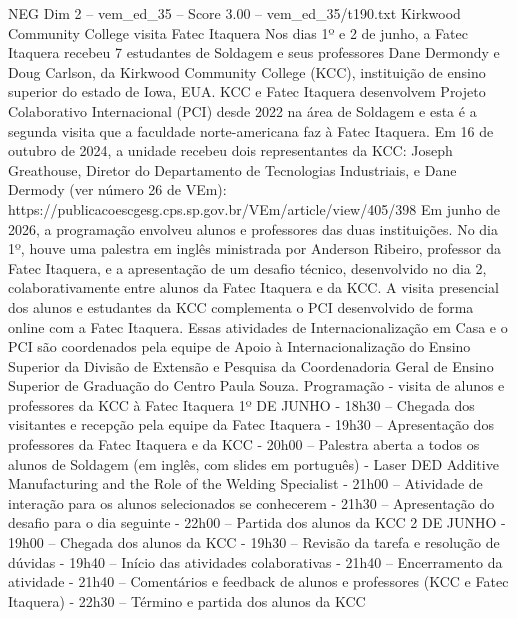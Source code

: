 \begin{textsample}{NEG Dim 2 – vem\_ed\_35 – Score 3.00 – vem\_ed\_35/t190.txt}  \label{ex:f2_neg_136}
Kirkwood Community College visita Fatec Itaquera Nos dias 1º e 2 de junho, a Fatec Itaquera recebeu 7 estudantes de Soldagem e seus professores Dane Dermondy e Doug Carlson, da Kirkwood Community College (KCC), instituição de ensino superior do estado de Iowa, EUA.
KCC e Fatec Itaquera desenvolvem Projeto Colaborativo Internacional (PCI) desde 2022 na área de Soldagem e esta é a segunda visita que a faculdade norte-americana faz à Fatec Itaquera.
Em 16 de outubro de 2024, a unidade recebeu dois representantes da KCC: Joseph Greathouse, Diretor do Departamento de Tecnologias Industriais, e Dane Dermody (ver número 26 de VEm): https://publicacoescgesg.cps.sp.gov.br/VEm/article/view/405/398 Em junho de 2026, a programação envolveu alunos e professores das duas instituições.
No dia 1º, houve uma palestra em inglês ministrada por Anderson Ribeiro, professor da Fatec Itaquera, e a apresentação de um desafio técnico, desenvolvido no dia 2, colaborativamente entre alunos da Fatec Itaquera e da KCC.
A visita presencial dos alunos e estudantes da KCC complementa o PCI desenvolvido de forma online com a Fatec Itaquera.
Essas atividades de Internacionalização em Casa e o PCI são coordenados pela equipe de Apoio à Internacionalização do Ensino Superior da Divisão de Extensão e Pesquisa da Coordenadoria Geral de Ensino Superior de Graduação do Centro Paula Souza.
Programação - visita de alunos e professores da KCC à Fatec Itaquera 1º DE JUNHO - 18h30 – Chegada dos visitantes e recepção pela equipe da Fatec Itaquera - 19h30 – Apresentação dos professores da Fatec Itaquera e da KCC - 20h00 – Palestra aberta a todos os alunos de Soldagem (em inglês, com slides em português) - Laser DED Additive Manufacturing and the Role of the Welding Specialist - 21h00 – Atividade de interação para os alunos selecionados se conhecerem - 21h30 – Apresentação do desafio para o dia seguinte - 22h00 – Partida dos alunos da KCC 2 DE JUNHO - 19h00 – Chegada dos alunos da KCC - 19h30 – Revisão da tarefa e resolução de dúvidas - 19h40 – Início das atividades colaborativas - 21h40 – Encerramento da atividade - 21h40 – Comentários e feedback de alunos e professores (KCC e Fatec Itaquera) - 22h30 – Término e partida dos alunos da KCC

\end{textsample}
